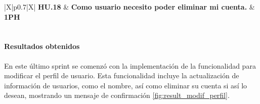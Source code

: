 \begin{table}[H]
\renewcommand{\arraystretch}{1.3}
\setlength{\tabcolsep}{10pt}
\vspace{0.8em}
\centering
\begin{tabularx}{\textwidth}{|X|p{}|X|}
    \hline
    \textbf{HU.18} & \textbf{Como usuario necesito poder eliminar mi cuenta.} & \textbf{1PH} \\
    \hline
     \\
    \hline
\end{tabularx}
\caption{HU.18 - Como usuario necesito poder eliminar mi cuenta - Desglose de tareas}
\vspace{0.8em}
\end{table}

\newpage
\paragraph{Resultados obtenidos}
En este último sprint se comenzó con la implementación de la funcionalidad para modificar el perfil de usuario.
Esta funcionalidad incluye la actualización de información de usuarios, como el nombre, así como eliminar su cuenta si así lo desean, mostrando un mensaje de confirmación \cref{fig:result_modif_perfil}.

